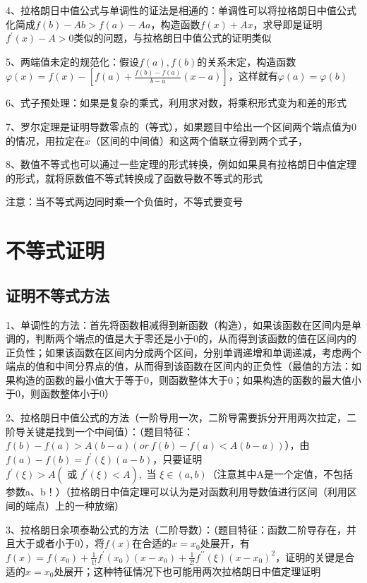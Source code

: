 4、拉格朗日中值公式与单调性的证法是相通的：单调性可以将拉格朗日中值公式化简成$f(b)-Ab>f(a)-Aa$，构造函数$f(x)+Ax$，求导即是证明$f^{\prime}(x)-A>0$类似的问题，与拉格朗日中值公式的证明类似

5、两端值未定的规范化：假设$f(a),f(b)$的关系未定，构造函数$\varphi(x)=f(x)-\left[f(a)+\frac{f(b)-f(a)}{b-a}(x-a)\right]$，这样就有$\varphi(a)=\varphi(b)$

6、式子预处理：如果是复杂的乘式，利用求对数，将乘积形式变为和差的形式

7、罗尔定理是证明导数零点的（等式），如果题目中给出一个区间两个端点值为0的情况，用拉定在$x$（区间的中间值）和这两个值联立得到两个式子，

8、数值不等式也可以通过一些定理的形式转换，例如如果具有拉格朗日中值定理的形式，就将原数值不等式转换成了函数导数不等式的形式

注意：当不等式两边同时乘一个负值时，不等式要变号

\section{不等式证明}



\subsection{证明不等式方法}

1、单调性的方法：首先将函数相减得到新函数（构造），如果该函数在区间内是单调的，判断两个端点的值是大于零还是小于0的，从而得到该函数的值在区间内的正负性；如果该函数在区间内分成两个区间，分别单调递增和单调递减，考虑两个端点的值和中间分界点的值，从而得到该函数在区间内的正负性（最值的方法：如果构造的函数的最小值大于等于0，则函数整体大于0；如果构造的函数的最大值小于0，则函数整体小于0）

2、拉格朗日中值公式的方法（一阶导用一次，二阶导需要拆分开用两次拉定，二阶导关键是找到一个中间值）：（题目特征：$f(b)-f(a)>A(b-a)(or \ f(b)-f(a)<A(b-a))$），由$f(a)-f(b)=f^{\prime}(\xi)(a-b)$，只要证明$f^{\prime}(\xi)>A\left(\text { 或 } f^{\prime}(\xi)<A\right), \text { 当 } \xi \in(a, b)$（注意其中A是一个定值，不包括参数a、b！）（拉格朗日中值定理可以认为是对函数利用导数值进行区间（利用区间的端点）上的一种放缩）

3、拉格朗日余项泰勒公式的方法（二阶导数）：（题目特征：函数二阶导存在，并且大于或者小于0），将$f(x)$在合适的$x=x_0$处展开，有$f(x)=f\left(x_{0}\right)+\frac{1}{1 !} f^{\prime}\left(x_{0}\right)\left(x-x_{0}\right)+\frac{1}{2 !} f^{\prime \prime}(\xi)\left(x-x_{0}\right)^{2}$，证明的关键是合适的$x=x_0$处展开；这种特征情况下也可能用两次拉格朗日中值定理证明



